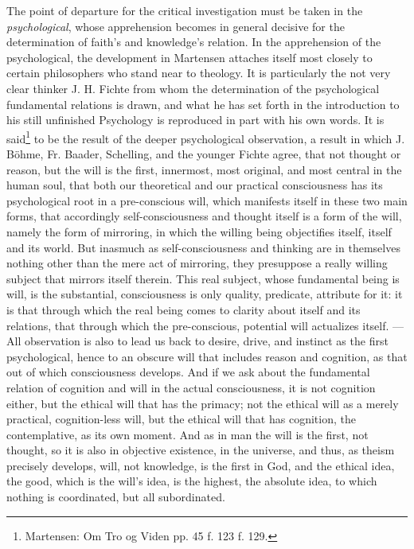 \documentclass[12pt,a4paper]{book}
\begin{document}
The point of departure for the critical investigation must be taken in the
\emph{psychological}, whose apprehension becomes in general decisive for the
determination of faith's and knowledge's relation. In the apprehension of the
psychological, the development in Martensen attaches itself most closely to
certain philosophers who stand near to theology. It is particularly the not very
clear thinker J. H. Fichte from whom the determination of the psychological
fundamental relations is drawn, and what he has set forth in the introduction to
his still unfinished Psychology is reproduced in part with his own words. It is
said\footnote{Martensen: Om Tro og Viden pp. 45 f. 123 f. 129.} to be the result
of the deeper psychological observation, a result in which J. Böhme, Fr. Baader,
Schelling, and the younger Fichte agree, that not thought or reason, but the will
is the first, innermost, most original, and most central in the human soul, that
both our theoretical and our practical consciousness has its psychological root in
a pre-conscious will, which manifests itself in these two main forms, that
accordingly self-consciousness and thought itself is a form of the will, namely
the form of mirroring, in which the willing being objectifies itself, itself and
its world. But inasmuch as self-consciousness and thinking are in themselves
nothing other than the mere act of mirroring, they presuppose a really willing
subject that mirrors itself therein. This real subject, whose fundamental being is
will, is the substantial, consciousness is only quality, predicate, attribute for
it: it is that through which the real being comes to clarity about itself and its
relations, that through which the pre-conscious, potential will actualizes itself.
---All observation is also to lead us back to desire, drive, and instinct as the
first psychological, hence to an obscure will that includes reason and cognition,
as that out of which consciousness develops. And if we ask about the fundamental
relation of cognition and will in the actual consciousness, it is not cognition
either, but the ethical will that has the primacy; not the ethical will as a
merely practical, cognition-less will, but the ethical will that has cognition,
the contemplative, as its own moment. And as in man the will is the first, not
thought, so it is also in objective existence, in the universe, and thus, as
theism precisely develops, will, not knowledge, is the first in God, and the
ethical idea, the good, which is the will's idea, is the highest, the absolute
idea, to which nothing is coordinated, but all subordinated.
\end{document}
